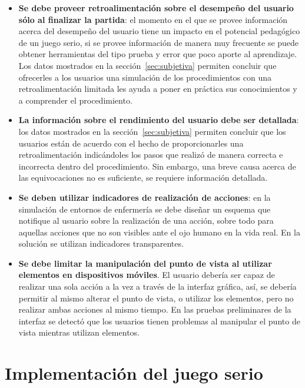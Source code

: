 \begin{itemize}
\item \textbf{Se debe proveer retroalimentación sobre el desempeño del usuario
        sólo al finalizar la partida}: el momento en el que se provee
    información acerca del desempeño del usuario tiene un impacto en el
    potencial pedagógico de un juego serio, si se provee información de manera
    muy frecuente se puede obtener herramientas del tipo prueba y error que poco
    aporte al aprendizaje. Los datos mostrados en la sección~\ref{sec:subjetiva}
    permiten concluir que ofrecerles a los usuarios una simulación de los
    procedimientos con una retroalimentación limitada les ayuda a poner en
    práctica sus conocimientos y a comprender el procedimiento. 

\item \textbf{La información sobre el rendimiento del usuario debe ser
        detallada}: los datos mostrados en la sección~\ref{sec:subjetiva}
    permiten concluir que los usuarios están de acuerdo con el hecho de
    proporcionarles una retroalimentación indicándoles los pasos que realizó de
    manera correcta e incorrecta dentro del procedimiento. Sin embargo, una
    breve causa acerca de las equivocaciones no es suficiente, se requiere
    información detallada. 
    
\item \textbf{Se deben utilizar indicadores de realización de acciones}: en la
    simulación de entornos de enfermería se debe diseñar un esquema que
    notifique al usuario sobre la realización de una acción, sobre todo para 
    aquellas acciones que no son visibles ante el ojo humano en la vida real. 
    En la solución se utilizan indicadores transparentes.

\item \textbf{Se debe limitar la manipulación del punto de vista al utilizar
        elementos en dispositivos móviles}. El usuario debería ser capaz de
    realizar una sola acción a la vez a través de la interfaz gráfica, así, se
    debería permitir al mismo alterar el punto de vista, o utilizar los
    elementos, pero no realizar ambas acciones al mismo tiempo. En las pruebas
    preliminares de la interfaz se detectó que los usuarios tienen problemas al
    manipular el punto de vista mientras utilizan elementos.

\end{itemize}

\section{Implementación del juego serio}

